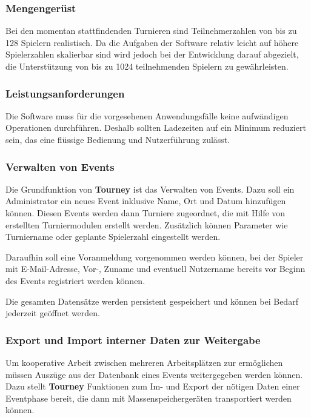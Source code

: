 \documentclass[11pt]{article}
\begin{document}
\subsubsection{Mengengerüst}

Bei den momentan stattfindenden Turnieren sind Teilnehmerzahlen von bis zu 128 Spielern realistisch. Da die Aufgaben der Software relativ leicht auf höhere Spielerzahlen skalierbar sind wird jedoch bei der Entwicklung darauf abgezielt, die Unterstützung von bis zu 1024 teilnehmenden Spielern zu gewährleisten.

\subsubsection{Leistungsanforderungen}

Die Software muss für die vorgesehenen Anwendungsfälle keine aufwändigen Operationen durchführen. Deshalb sollten Ladezeiten auf ein Minimum reduziert sein, das eine flüssige Bedienung und Nutzerführung zulässt.

\subsubsection{Verwalten von Events}

Die Grundfunktion von \textbf{Tourney} ist das Verwalten von Events. Dazu soll ein Administrator ein neues Event inklusive Name, Ort und Datum hinzufügen können. Diesen Events werden dann Turniere zugeordnet, die mit Hilfe von erstellten Turniermodulen erstellt werden. Zusätzlich können Parameter wie Turniername oder geplante Spielerzahl eingestellt werden.

Daraufhin soll eine Voranmeldung vorgenommen werden können, bei der Spieler mit E-Mail-Adresse, Vor-, Zuname und eventuell Nutzername bereits vor Beginn des Events registriert werden können.

Die gesamten Datensätze werden persistent gespeichert und können bei Bedarf jederzeit geöffnet werden.

\subsubsection{Export und Import interner Daten zur Weitergabe}

Um kooperative Arbeit zwischen mehreren Arbeitsplätzen zur ermöglichen müssen Auszüge aus der Datenbank eines Events weitergegeben werden können. Dazu stellt \textbf{Tourney} Funktionen zum Im- und Export der nötigen Daten einer Eventphase bereit, die dann mit Massenspeichergeräten transportiert werden können.
\end{document}
